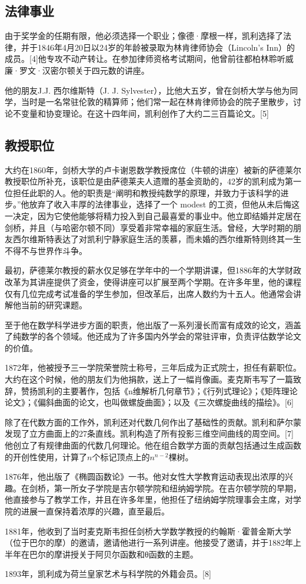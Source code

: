 \subsection{法律事业}  
由于奖学金的任期有限，他必须选择一个职业；像德·摩根一样，凯利选择了法律，并于1846年4月20日以24岁的年龄被录取为林肯律师协会（Lincoln's Inn）的成员。[4]他专攻不动产转让。在参加律师资格考试期间，他曾前往都柏林聆听威廉·罗文·汉密尔顿关于四元数的讲座。

他的朋友J.J. 西尔维斯特（J. J. Sylvester），比他大五岁，曾在剑桥大学与他为同学，当时是一名常驻伦敦的精算师；他们常一起在林肯律师协会的院子里散步，讨论不变量和协变理论。在这十四年间，凯利创作了大约二三百篇论文。[5]
\subsection{教授职位}  
大约在1860年，剑桥大学的卢卡谢恩数学教授席位（牛顿的讲座）被新的萨德莱尔教授职位所补充，该职位是由萨德莱夫人遗赠的基金资助的，42岁的凯利成为第一位担任此职的人。他的职责是“阐明和教授纯数学的原理，并致力于该科学的进步。”他放弃了收入丰厚的法律事业，选择了一个 modest 的工资，但他从未后悔这一决定，因为它使他能够将精力投入到自己最喜爱的事业中。他立即结婚并定居在剑桥，并且（与哈密尔顿不同）享受着非常幸福的家庭生活。曾经，大学时期的朋友西尔维斯特表达了对凯利宁静家庭生活的羡慕，而未婚的西尔维斯特则终其一生不得不与世界作斗争。

最初，萨德莱尔教授的薪水仅足够在学年中的一个学期讲课，但1886年的大学财政改革为其讲座提供了资金，使得讲座可以扩展至两个学期。在许多年里，他的课程仅有几位完成考试准备的学生参加，但改革后，出席人数约为十五人。他通常会讲解他当前的研究课题。

至于他在数学科学进步方面的职责，他出版了一系列漫长而富有成效的论文，涵盖了纯数学的各个领域。他还成为了许多国内外学会的常驻评审，负责评估数学论文的价值。

1872年，他被授予三一学院荣誉院士称号，三年后成为正式院士，担任有薪职位。大约在这个时候，他的朋友们为他捐款，送上了一幅肖像画。麦克斯韦写了一篇致辞，赞扬凯利的主要著作，包括《n维解析几何章节》；《行列式理论》；《矩阵理论论文》；《偏斜曲面的论文，也叫做螺旋曲面》；以及《三次螺旋曲线的描绘》。[6] 

除了在代数方面的工作外，凯利还对代数几何作出了基础性的贡献。凯利和萨尔蒙发现了立方曲面上的27条直线。凯利构造了所有投影三维空间曲线的周空间。[7]他创立了有规律曲面的代数几何理论。他在组合数学方面的贡献包括通过生成函数的开创性使用，计算了\(n\)个标记顶点上的\(n^{n-2}\)棵树。

1876年，他出版了《椭圆函数论》一书。他对女性大学教育运动表现出浓厚的兴趣。在剑桥，第一所女子学院是吉尔顿学院和纽纳姆学院。在吉尔顿学院的早期，他直接参与了教学工作，并且在许多年里，他担任了纽纳姆学院理事会主席，对学院的进展一直保持着浓厚的兴趣，直至最后。

1881年，他收到了当时麦克斯韦担任剑桥大学数学教授的约翰斯·霍普金斯大学（位于巴尔的摩）的邀请，邀请他进行一系列讲座。他接受了邀请，并于1882年上半年在巴尔的摩讲授关于阿贝尔函数和θ函数的主题。

1893年，凯利成为荷兰皇家艺术与科学院的外籍会员。[8]
